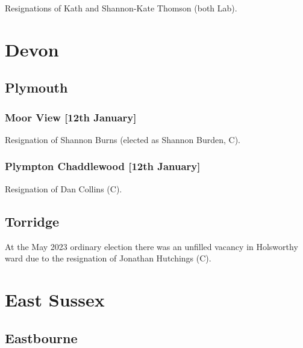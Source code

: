 \documentclass[a4paper,openany]{book}
\begin{document}
\begin{resultsiii}

Resignations of Kath and Shannon-Kate Thomson (both Lab).

\section{Devon}

\subsection*{Plymouth}

\subsubsection*{Moor View \hspace*{\fill}\nolinebreak[1]%
	\enspace\hspace*{\fill}
	[12th January]}


Resignation of Shannon Burns (elected as Shannon Burden, C).

\subsubsection*{Plympton Chaddlewood \hspace*{\fill}\nolinebreak[1]%
	\enspace\hspace*{\fill}
	[12th January]}


Resignation of Dan Collins (C).

\subsection*{Torridge}

At the May 2023 ordinary election there was an unfilled vacancy in Holsworthy ward due to the resignation of Jonathan Hutchings (C).%

\section{East Sussex}

\subsection*{Eastbourne}


\end{resultsiii}
\end{document}
